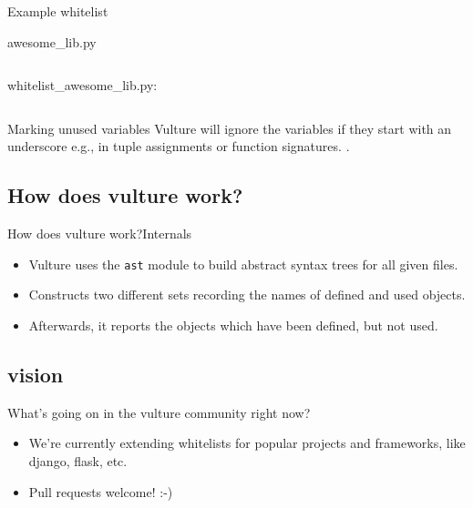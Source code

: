 \documentclass{beamer}
\begin{document}
\begin{frame}{Example whitelist}
    \begin{block}{awesome\_lib.py}
        \inputminted{python}{content/yourAwesomeLib.py}
    \end{block}
    \begin{block}{whitelist\_awesome\_lib.py:}
        \inputminted{python}{content/whitelistYourAwesomeLib.py}
    \end{block}
\end{frame}

\begin{frame}{Marking unused variables}
    Vulture will ignore the variables if they start with an underscore
    e.g., in tuple assignments or function signatures.  .
\end{frame}

\subsection{How does vulture work?}

\begin{frame}{How does vulture work?}{Internals}
\begin{itemize}
    \item
        Vulture uses the \texttt{ast} module to build abstract syntax trees for all given files.
    \pause
    \item
        Constructs two different sets recording the names of defined and used objects.
    \pause
    \item
        Afterwards, it reports the objects which have been defined, but not used.
\end{itemize}
\end{frame}

\subsection*{vision}
\begin{frame}{What's going on in the vulture community right now?}
    \begin{itemize}
        \item
            We're currently extending whitelists for popular projects and frameworks, like django, flask, etc.
        \item
            Pull requests welcome! :-)
    \end{itemize}
\end{frame}
\end{document}
